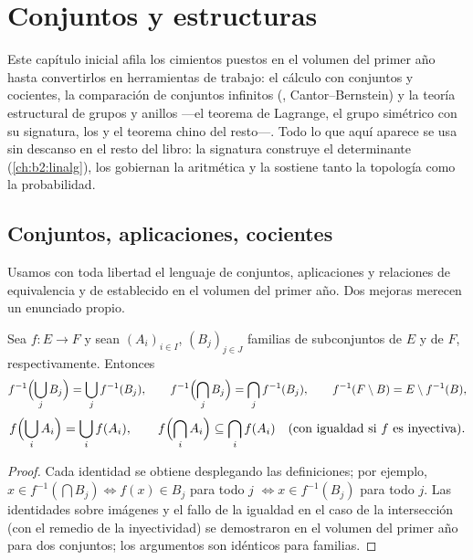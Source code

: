 \chapter{Conjuntos y estructuras}\label{ch:b2:structures}

Este capítulo inicial afila los cimientos puestos en el volumen del
primer año hasta convertirlos en herramientas de trabajo: el cálculo
con conjuntos y cocientes, la comparación de conjuntos infinitos
(,
Cantor--Bernstein) y la teoría estructural de grupos y anillos ---el
teorema de Lagrange, el grupo simétrico con su signatura, los
 y el teorema chino del resto---.
Todo lo que aquí aparece se usa sin descanso en el resto del libro: la
signatura construye el determinante (\cref{ch:b2:linalg}), los
 gobiernan la
aritmética y la 
sostiene tanto la topología como la probabilidad.

\section{Conjuntos, aplicaciones, cocientes}

Usamos con toda libertad el lenguaje de conjuntos, aplicaciones y
relaciones de equivalencia y de 
establecido en el volumen del primer año. Dos mejoras merecen un
enunciado propio.

\begin{proposition}\label{prop:b2:structures:images}
Sea $f \colon E \to F$ y sean $(A_i)_{i \in I}$, $(B_j)_{j \in J}$
familias de subconjuntos de $E$ y de $F$, respectivamente. Entonces
\[
f^{-1}\Bigl(\bigcup_j B_j\Bigr) = \bigcup_j f^{-1}(B_j),
\qquad
f^{-1}\Bigl(\bigcap_j B_j\Bigr) = \bigcap_j f^{-1}(B_j),
\qquad
f^{-1}(F \setminus B) = E \setminus f^{-1}(B),
\]
\[
f\Bigl(\bigcup_i A_i\Bigr) = \bigcup_i f(A_i),
\qquad
f\Bigl(\bigcap_i A_i\Bigr) \subseteq \bigcap_i f(A_i)
\quad (\text{con igualdad si } f \text{ es inyectiva}).
\]
\end{proposition}

\begin{proof}
Cada identidad se obtiene desplegando las definiciones; por ejemplo,
$x \in f^{-1}(\bigcap B_j) \iff f(x) \in B_j$ para todo $j$ $\iff x
\in f^{-1}(B_j)$ para todo $j$. Las identidades sobre imágenes y el
fallo de la igualdad en el caso de la intersección (con el remedio de
la inyectividad) se demostraron en el volumen del primer año para dos
conjuntos; los argumentos son idénticos para familias.
\end{proof}

